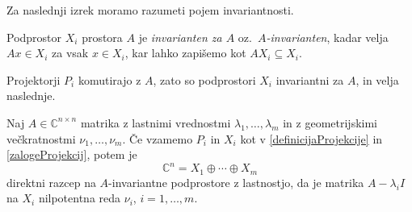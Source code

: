 \documentclass[mat1]{fmfdelo}
\newcommand{\C}{\mathbb C}
\begin{document}
Za naslednji izrek moramo razumeti pojem invariantnosti.
\begin{definicija}
    Podprostor $X_i$ prostora $A$ je \emph{invarianten za $A$} oz.\ \emph{$A$-invarianten}, kadar velja $A x \in X_i$ za vsak $x \in X_i$, kar lahko zapišemo kot $A X_i \subseteq X_i$.
\end{definicija}
Projektorji $P_i$ komutirajo z $A$, zato so podprostori $X_i$ invariantni za $A$, in velja naslednje. 
\begin{izrek}\label{trditevSpektralniRazcep}
    Naj $A \in \C^{n \times n}$ matrika z lastnimi vrednostmi $\lambda_1, \ldots, \lambda_m$ in z geometrijskimi večkratnostmi $\nu_1, \ldots, \nu_m$. Če vzamemo $P_i$ in $X_i$ kot v \eqref{definicijaProjekcije} in \eqref{zalogeProjekcij}, potem je
    \begin{equation}\label{eqSpektralniRazcep}
        \C^n = X_1 \oplus \cdots \oplus X_m
    \end{equation}
    direktni razcep na $A$-invariantne podprostore z lastnostjo, da je matrika $A - \lambda_i I$ na $X_i$ nilpotentna reda $\nu_i$, $i = 1, \ldots, m$.
\end{izrek}
\end{document}
